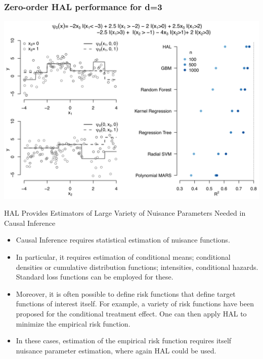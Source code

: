 \documentclass[t]{beamer}
\begin{document}
\begin{frame}
\frametitle{Zero-order HAL performance for d=3}
  \vspace{-10pt}
  \begin{center}
  \includegraphics[width = 1\textwidth]{figures/HALworks.png}
  \end{center}
\end{frame}

\begin{frame}{HAL Provides Estimators of Large Variety of Nuisance Parameters Needed in Causal Inference}
\begin{itemize}
\item Causal Inference requires statistical estimation of nuisance functions.
\item In particular, it requires  estimation of conditional means; conditional  densities or cumulative distribution functions; intensities, conditional hazards. Standard loss functions can be employed for these.
\item Moreover, it is often possible to define risk functions that define  target functions of interest itself. For example, a variety of risk functions have been proposed for the conditional treatment effect. One can then apply HAL to minimize the empirical risk function.
\item In these cases,  estimation of the empirical risk function requires itself nuisance parameter estimation, where again HAL could be used.
\end{itemize}
\end{frame}
\end{document}
